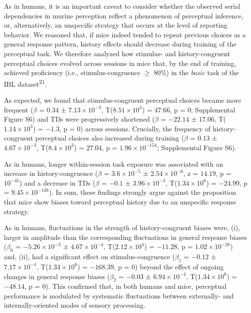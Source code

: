 \documentclass[
]{article}
\begin{document}
As in humans, it is an important caveat to consider whether the observed
serial dependencies in murine perception reflect a phenomenon of
perceptual inference, or, alternatively, an unspecific strategy that
occurs at the level of reporting behavior. We reasoned that, if mice
indeed tended to repeat previous choices as a general response pattern,
history effects should decrease during training of the perceptual task.
We therefore analyzed how stimulus- and history-congruent perceptual
choices evolved across sessions in mice that, by the end of training,
achieved proficiency (i.e., stimulus-congruence \(\geq\) 80\%) in the
\emph{basic} task of the IBL dataset\textsuperscript{21}.

As expected, we found that stimulus-congruent perceptual choices became
more frequent (\(\beta\) = \(0.34\) ±
\(\ensuremath{7.13\times 10^{-3}}\),
T(\(\ensuremath{8.51\times 10^{3}}\)) = \(47.66\), p = \(0\);
Supplemental Figure S6) and TDs were progressively shortened (\(\beta\)
= \(-22.14\) ± \(17.06\), T(\(\ensuremath{1.14\times 10^{3}}\)) =
\(-1.3\), p = \(0\)) across sessions. Crucially, the frequency of
history-congruent perceptual choices also increased during training
(\(\beta\) = \(0.13\) ± \(\ensuremath{4.67\times 10^{-3}}\),
T(\(\ensuremath{8.4\times 10^{3}}\)) = \(27.04\), p =
\(\ensuremath{1.96\times 10^{-154}}\); Supplemental Figure S6).

As in humans, longer within-session task exposure was associated with an
increase in history-congruence (\(\beta\) =
\(\ensuremath{3.6\times 10^{-5}}\) ±
\(\ensuremath{2.54\times 10^{-6}}\), z = \(14.19\), p =
\(\ensuremath{10^{-45}}\)) and a decrease in TDs (\(\beta\) = \(-0.1\) ±
\(\ensuremath{3.96\times 10^{-3}}\),
T(\(\ensuremath{1.34\times 10^{6}}\)) = \(-24.99\), p =
\(\ensuremath{9.45\times 10^{-138}}\)). In sum, these findings strongly
argue against the proposition that mice show biases toward perceptual
history due to an unspecific response strategy.

As in humans, fluctuations in the strength of history-congruent biases
were, (i), larger in amplitude than the corresponding fluctuations in
general response biases (\(\beta_0\) =
\(\ensuremath{-5.26\times 10^{-3}}\) ±
\(\ensuremath{4.67\times 10^{-4}}\),
T(\(\ensuremath{2.12\times 10^{3}}\)) = \(-11.28\), p =
\(\ensuremath{1.02\times 10^{-28}}\)) and, (ii), had a significant
effect on stimulus-congruence (\(\beta_1\) = \(-0.12\) ±
\(\ensuremath{7.17\times 10^{-4}}\),
T(\(\ensuremath{1.34\times 10^{6}}\)) = \(-168.39\), p = \(0\)) beyond
the effect of ongoing changes in general response biases (\(\beta_2\) =
\(-0.03\) ± \(\ensuremath{6.94\times 10^{-4}}\),
T(\(\ensuremath{1.34\times 10^{6}}\)) = \(-48.14\), p = \(0\)). This
confirmed that, in both humans and mice, perceptual performance is
modulated by systematic fluctuations between externally- and
internally-oriented modes of sensory processing.
\end{document}
